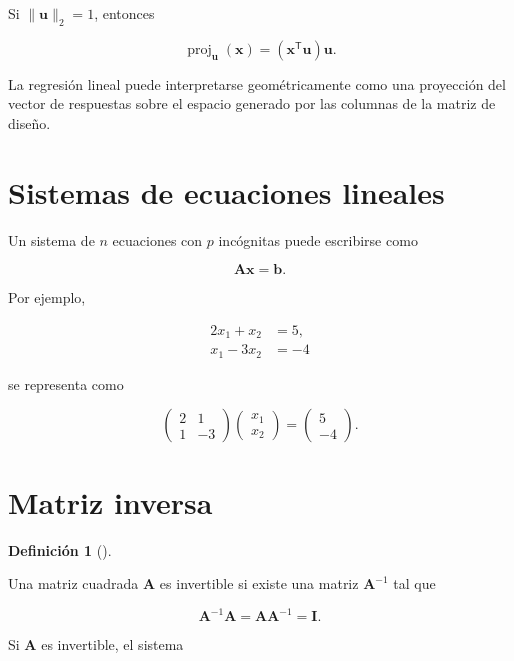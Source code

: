 \documentclass[
  spanish,
  11pt,
  letterpaper,
  DIV=11,
  numbers=noendperiod]{scrreprt}
\theoremstyle{definition}
\newtheorem{definition}{Definición}[chapter]
\theoremstyle{plain}
\theoremstyle{definition}
\theoremstyle{remark}
\begin{document}
Si \(\|\mathbf{u}\|_2=1\), entonces

\[
\operatorname{proj}_{\mathbf{u}}(\mathbf{x})
=
(\mathbf{x}^{\mathsf T}\mathbf{u})\mathbf{u}.
\]

La regresión lineal puede interpretarse geométricamente como una
proyección del vector de respuestas sobre el espacio generado por las
columnas de la matriz de diseño.

\section{Sistemas de ecuaciones
lineales}\label{sistemas-de-ecuaciones-lineales}

Un sistema de \(n\) ecuaciones con \(p\) incógnitas puede escribirse
como

\[
\mathbf{A}\mathbf{x}
=
\mathbf{b}.
\]

Por ejemplo,

\[
\begin{aligned}
2x_1+x_2&=5,\\
x_1-3x_2&=-4
\end{aligned}
\]

se representa como

\[
\begin{pmatrix}
2 & 1\\
1 & -3
\end{pmatrix}
\begin{pmatrix}
x_1\\
x_2
\end{pmatrix}
=
\begin{pmatrix}
5\\
-4
\end{pmatrix}.
\]

\section{Matriz inversa}\label{matriz-inversa}

\begin{definition}[]\protect\hypertarget{def-matriz-inversa}{}\label{def-matriz-inversa}

Una matriz cuadrada \(\mathbf{A}\) es invertible si existe una matriz
\(\mathbf{A}^{-1}\) tal que

\[
\mathbf{A}^{-1}\mathbf{A}
=
\mathbf{A}\mathbf{A}^{-1}
=
\mathbf{I}.
\]

\end{definition}

Si \(\mathbf{A}\) es invertible, el sistema
\end{document}
